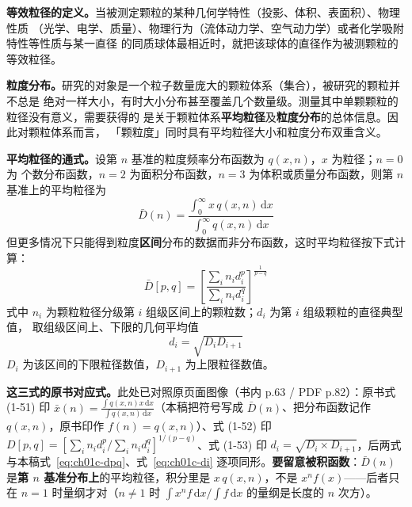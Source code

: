 \begin{principle}
\textbf{等效粒径的定义。}当被测定颗粒的某种几何学特性（投影、体积、表面积）、物理性质
（光学、电学、质量）、物理行为（流体动力学、空气动力学）或者化学吸附特性等性质与某一直径
的同质球体最相近时，就把该球体的直径作为被测颗粒的等效粒径。

\textbf{粒度分布。}研究的对象是一个粒子数量庞大的颗粒体系（集合），被研究的颗粒并不总是
绝对一样大小，有时大小分布甚至覆盖几个数量级。测量其中单颗颗粒的粒径没有意义，需要获得的
是关于颗粒体系\textbf{平均粒径}及\textbf{粒度分布}的总体信息。因此对颗粒体系而言，
「颗粒度」同时具有平均粒径大小和粒度分布双重含义。

\textbf{平均粒径的通式。}设第 $n$ 基准的粒度频率分布函数为 $q(x,n)$，$x$ 为粒径；$n=0$ 为
个数分布函数，$n=2$ 为面积分布函数，$n=3$ 为体积或质量分布函数，则第 $n$ 基准上的平均粒径为
\begin{equation}\label{eq:ch01c-dn}
\bar{D}(n)=\frac{\int_{0}^{\infty}x\,q(x,n)\,\mathrm{d}x}{\int_{0}^{\infty}q(x,n)\,\mathrm{d}x}
\end{equation}
但更多情况下只能得到粒度\textbf{区间}分布的数据而非分布函数，这时平均粒径按下式计算：
\begin{equation}\label{eq:ch01c-dpq}
\bar{D}[p,q]=\left[\frac{\sum_{i}n_{i}d_{i}^{p}}{\sum_{i}n_{i}d_{i}^{q}}\right]^{\frac{1}{p-q}}
\end{equation}
式中 $n_i$ 为颗粒粒径分级第 $i$ 组级区间上的颗粒数；$d_i$ 为第 $i$ 组级颗粒的直径典型值，
取组级区间上、下限的几何平均值
\begin{equation}\label{eq:ch01c-di}
d_{i}=\sqrt{D_{i}D_{i+1}}
\end{equation}
$D_i$ 为该区间的下限粒径数值，$D_{i+1}$ 为上限粒径数值。

\textbf{这三式的原书对应式。}此处已对照原页面图像（书内 p.63 / PDF p.82）：原书式 (1-51) 印
$\bar{x}(n)=\frac{\int q(x,n)x\,\mathrm{d}x}{\int q(x,n)\,\mathrm{d}x}$（本稿把符号写成
$\bar{D}(n)$、把分布函数记作 $q(x,n)$，原书印作 $f(n)=q(x,n)$）、式 (1-52) 印
$D[p,q]=\left[\sum_{i}n_{i}d_{i}^{p}\big/\sum_{i}n_{i}d_{i}^{q}\right]^{1/(p-q)}$、式 (1-53) 印
$d_{i}=\sqrt{D_{i}\times D_{i+1}}$，后两式与本稿式~\eqref{eq:ch01c-dpq}、式~\eqref{eq:ch01c-di}
逐项同形。\textbf{要留意被积函数}：$\bar{D}(n)$ 是\textbf{第 $n$ 基准分布上}的平均粒径，积分里是
$x\,q(x,n)$，不是 $x^{n}f(x)$——后者只在 $n=1$ 时量纲才对（$n\neq1$ 时
$\int x^{n}f\,\mathrm{d}x\big/\int f\,\mathrm{d}x$ 的量纲是长度的 $n$ 次方）。


\end{principle}
